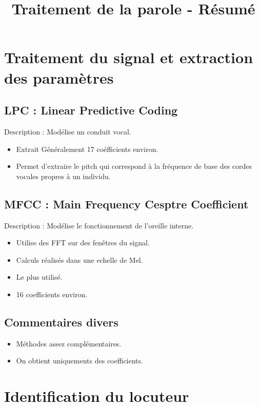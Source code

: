 \documentclass[a4paper, 12pt, leqno]{article}
\title{\huge{Traitement de la parole - Résumé}}
\begin{document}
\maketitle

\section{Traitement du signal et extraction des paramètres}
\subsection{LPC : Linear Predictive Coding}

Description : Modélise un conduit vocal.

\begin{itemize}
  \item Extrait Généralement 17 coéfficients environ.
  \item Permet d'extraire le pitch qui correspond à la fréquence de base des
  cordes vocales propres à un individu.
\end{itemize}

\subsection{MFCC : Main Frequency Cesptre Coefficient}

Description : Modélise le fonctionnement de l'oreille interne.

\begin{itemize}
  \item Utilise des FFT sur des fenêtres du signal.
  \item Calculs réalisés dans une echelle de Mel.
  \item Le plus utilisé.
  \item 16 coefficients environ.
\end{itemize}

\subsection{Commentaires divers}
\begin{itemize}
  \item Méthodes assez complémentaires.
  \item On obtient uniquements des coefficients.
\end{itemize}

\section{Identification du locuteur}
\end{document}
